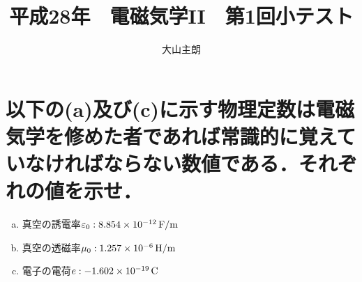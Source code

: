 \documentclass[dvipdfmx]{ujarticle}
\begin{document}
\title{平成28年　電磁気学II　第1回小テスト}
\date{}
\author{大山主朗}

\maketitle

\section{以下の(a)及び(c)に示す物理定数は電磁気学を修めた者であれば常識的に覚えていなければならない数値である．それぞれの値を示せ．}
\begin{enumerate}[(a)]
	\item 真空の誘電率$\varepsilon_{0}:8.854 \times 10^{-12}\,\rm{F/m}$
	\item 真空の透磁率$\mu_{0}:1.257 \times 10^{-6}\,\rm{H/m}$
	\item 電子の電荷$e:-1.602 \times 10^{-19}\,\rm{C}$
\end{enumerate}
\end{document}
